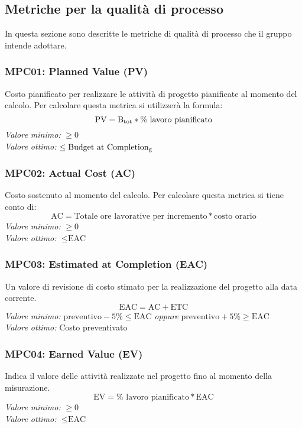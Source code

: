 \subsection{Metriche per la qualità di processo}
In questa sezione sono descritte le metriche di qualità di processo che il gruppo intende adottare.

\subsubsection{MPC01: Planned Value (PV)}
Costo pianificato per realizzare le attività di progetto pianificate al momento del calcolo.
Per calcolare questa metrica si utilizzerà la formula:
\begin{equation*}
\text{PV}=\text{B}\textsubscript{tot}*\%\text{ lavoro pianificato}
\end{equation*}
\textit{Valore minimo:} $\ge 0$\\
\textit{Valore ottimo:}	$\le \text{Budget at Completion\textsubscript{g}}$
\subsubsection{MPC02: Actual Cost (AC)}
Costo sostenuto al momento del calcolo.
Per calcolare questa metrica si tiene conto di:
\begin{equation*}
\text{AC}=\text{Totale ore lavorative per incremento}*\text{costo orario}
\end{equation*}
\textit{Valore minimo:} $\ge 0$\\
\textit{Valore ottimo:} $\le \text{EAC}$
\subsubsection{MPC03: Estimated at Completion (EAC)}
Un valore di revisione di costo stimato per la realizzazione del progetto alla data corrente.
\begin{equation*}
\text{EAC}=\text{AC}+\text{ETC}
\end{equation*}
\textit{Valore minimo:} 
$\text{preventivo} -5\% \le \text{EAC}$ \textit{oppure} $\text{preventivo} +5\% \ge \text{EAC}$\\
\textit{Valore ottimo:} Costo preventivato
\subsubsection{MPC04: Earned Value (EV)}
Indica il valore delle attività realizzate nel progetto fino al momento della misurazione.
\begin{equation*}
\text{EV}=\%\text{ lavoro pianificato}*\text{EAC}
\end{equation*}
\textit{Valore minimo:} $\ge 0$\\
\textit{Valore ottimo:} $\le \text{EAC}$
